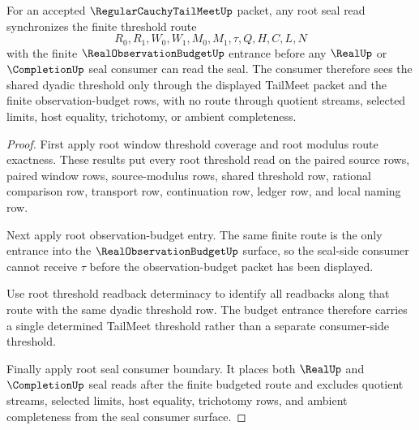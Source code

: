 \begin{theorem}
\label{thm:regular-cauchy-tail-meet-root-seal-budget-synchronization}
For an accepted $\RegularCauchyTailMeetUp$ packet, any root seal read synchronizes the finite threshold route
$$
R_0,R_1,W_0,W_1,M_0,M_1,\tau,Q,H,C,L,N
$$
with the finite $\RealObservationBudgetUp$ entrance before any $\RealUp$ or $\CompletionUp$ seal consumer can read the seal. The consumer therefore sees the shared dyadic threshold only through the displayed TailMeet packet and the finite observation-budget rows, with no route through quotient streams, selected limits, host equality, trichotomy, or ambient completeness.
\end{theorem}
\begin{proof}
First apply root window threshold coverage and root modulus route exactness. These results put every root threshold read on the paired source rows, paired window rows, source-modulus rows, shared threshold row, rational comparison row, transport row, continuation row, ledger row, and local naming row.

Next apply root observation-budget entry. The same finite route is the only entrance into the $\RealObservationBudgetUp$ surface, so the seal-side consumer cannot receive $\tau$ before the observation-budget packet has been displayed.

Use root threshold readback determinacy to identify all readbacks along that route with the same dyadic threshold row. The budget entrance therefore carries a single determined TailMeet threshold rather than a separate consumer-side threshold.

Finally apply root seal consumer boundary. It places both $\RealUp$ and $\CompletionUp$ seal reads after the finite budgeted route and excludes quotient streams, selected limits, host equality, trichotomy rows, and ambient completeness from the seal consumer surface.
\end{proof}

